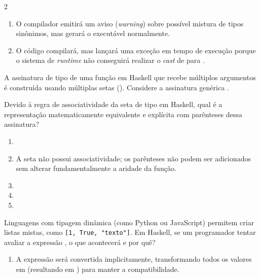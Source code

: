 \documentclass[a4paper,10pt,brazil]{article}
\begin{document}
\begin{multicols}{2}
\begin{enumerate}
  \item O compilador emitirá um aviso (\emph{warning}) sobre possível mistura de tipos sinônimos, mas gerará o executável normalmente.

  \item O código compilará, mas lançará uma exceção em tempo de execução porque o sistema de \emph{runtime} não conseguirá realizar o \emph{cast} de  para .


\end{enumerate}

A assinatura de tipo de uma função em Haskell que recebe múltiplos argumentos é construída usando múltiplas setas (\haskellinline{->}). Considere a assinatura genérica . 

Devido à regra de associatividade da seta de tipo em Haskell, qual é a representação matematicamente equivalente e explícita com parênteses dessa assinatura?

\begin{enumerate}
  \item {}

  \item A seta não possui associatividade; os parênteses não podem ser adicionados sem alterar fundamentalmente a aridade da função.

  \item {}

  \item {}

  \item {}


\end{enumerate}

Linguagens com tipagem dinâmica (como Python ou JavaScript) permitem criar listas mistas, como \texttt{[1, True, "texto"]}. Em Haskell, se um programador tentar avaliar a expressão , o que acontecerá e por quê?

\begin{enumerate}
  \item A expressão será convertida implicitamente, transformando todos os valores em  (resultando em ) para manter a compatibilidade.


\end{enumerate}
\end{multicols}
\end{document}
